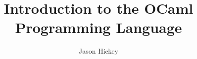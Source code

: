 \documentclass{book}
\title{Introduction to the OCaml Programming Language}
\author{Jason Hickey}
\begin{document}
\maketitle
\tableofcontents

\sloppy





\end{document}
